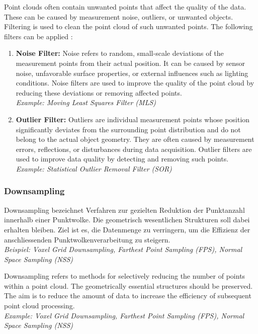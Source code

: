 \begin{English}
    Point clouds often contain unwanted points that affect the quality of the data. These can be caused by measurement noise, outliers, or unwanted objects. Filtering is used to clean the point cloud of such unwanted points. The following filters can be applied \cite{liu3DPointCloud2021}:

    \begin{enumerate}
        \item \textbf{Noise Filter:} Noise refers to random, small-scale deviations of the measurement points from their actual position. It can be caused by sensor noise, unfavorable surface properties, or external influences such as lighting conditions. Noise filters are used to improve the quality of the point cloud by reducing these deviations or removing affected points.\\
        \textit{Example: Moving Least Squares Filter (MLS)}
        
        \item \textbf{Outlier Filter:} Outliers are individual measurement points whose position significantly deviates from the surrounding point distribution and do not belong to the actual object geometry. They are often caused by measurement errors, reflections, or disturbances during data acquisition. Outlier filters are used to improve data quality by detecting and removing such points.\\
        \textit{Example: Statistical Outlier Removal Filter (SOR)}
    \end{enumerate}
\end{English}

\subsubsection{Downsampling}
\begin{German}
        Downsampling bezeichnet Verfahren zur gezielten Reduktion der Punktanzahl innerhalb einer Punktwolke. Die geometrisch wesentlichen Strukturen soll dabei erhalten bleiben. Ziel ist es, die Datenmenge zu verringern, um die Effizienz der anschliessenden Punktwolkenverarbeitung zu steigern.\\
        \textit{Beispiel: Voxel Grid Downsampling, Farthest Point Sampling (FPS), Normal Space Sampling (NSS)}
\end{German}

\begin{English}
    Downsampling refers to methods for selectively reducing the number of points within a point cloud. The geometrically essential structures should be preserved. The aim is to reduce the amount of data to increase the efficiency of subsequent point cloud processing.\\
    \textit{Example: Voxel Grid Downsampling, Farthest Point Sampling (FPS), Normal Space Sampling (NSS)}
\end{English}
  

